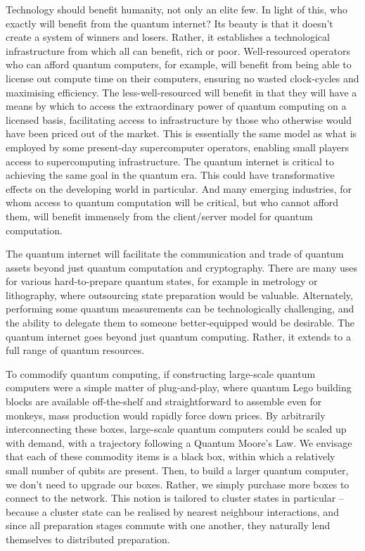 \documentclass[aps,rmp,twocolumn,amsmath,amssymb,nofootinbib,superscriptaddress]{revtex4}
\begin{document}
Technology should benefit humanity, not only an elite few. In light of this, who exactly will benefit from the quantum internet? Its beauty is that it doesn't create a system of winners and losers. Rather, it establishes a technological infrastructure from which all can benefit, rich or poor. Well-resourced operators who can afford quantum computers, for example, will benefit from being able to license out compute time on their computers, ensuring no wasted clock-cycles and maximising efficiency. The less-well-resourced will benefit in that they will have a means by which to access the extraordinary power of quantum computing on a licensed basis, facilitating access to infrastructure by those who otherwise would have been priced out of the market. This is essentially the same model as what is employed by some present-day supercomputer operators, enabling small players access to supercomputing infrastructure. The quantum internet is critical to achieving the same goal in the quantum era. This could have transformative effects on the developing world in particular. And many emerging industries, for whom access to quantum computation will be critical, but who cannot afford them, will benefit immensely from the client/server model for quantum computation.

The quantum internet will facilitate the communication and trade of quantum assets beyond just quantum computation and cryptography. There are many uses for various hard-to-prepare quantum states, for example in metrology or lithography, where outsourcing state preparation would be valuable. Alternately, performing some quantum measurements can be technologically challenging, and the ability to delegate them to someone better-equipped would be desirable. The quantum internet goes beyond just quantum computing. Rather, it extends to a full range of quantum resources.

To commodify quantum computing, if constructing large-scale quantum computers were a simple matter of plug-and-play, where quantum Lego building blocks are available off-the-shelf and straightforward to assemble even for monkeys, mass production would rapidly force down prices. By arbitrarily interconnecting these boxes, large-scale quantum computers could be scaled up with demand, with a trajectory following a Quantum Moore's Law. We envisage that each of these commodity items is a black box, within which a relatively small number of qubits are present. Then, to build a larger quantum computer, we don't need to upgrade our boxes. Rather, we simply purchase more boxes to connect to the network. This notion is tailored to cluster states in particular -- because a cluster state can be realised by nearest neighbour interactions, and since all preparation stages commute with one another, they naturally lend themselves to distributed preparation.
\end{document}
